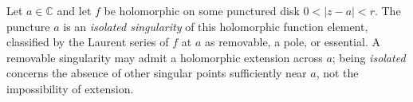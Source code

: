 
Let $a\in\mathbb C$ and let $f$ be holomorphic on some punctured disk $0<|z-a|<r$. The puncture $a$ is an \emph{isolated singularity} of this holomorphic function element, classified by the Laurent series of $f$ at $a$ as removable, a pole, or essential. A removable singularity may admit a holomorphic extension across $a$; being \emph{isolated} concerns the absence of other singular points sufficiently near $a$, not the impossibility of extension.

